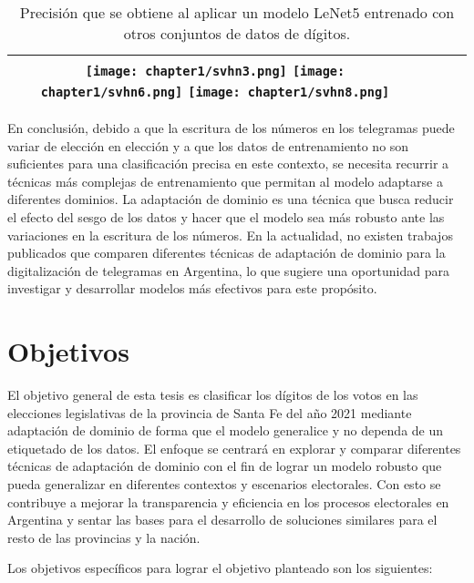 \begin{table}[H]
\begin{tabular}{c|ccc}
        \texttt{[image: chapter1/svhn3.png]}
        \texttt{[image: chapter1/svhn6.png]}
        \texttt{[image: chapter1/svhn8.png]}                              &                                                   &                                   &                                   \\
        \bottomrule
    \end{tabular}
    \caption{Precisión que se obtiene al aplicar un modelo LeNet5 entrenado con otros conjuntos de datos de dígitos.}
    \label{tab:lenet-distintos-datasets}
\end{table}

En conclusión, debido a que la escritura de los números en los telegramas puede variar de elección en elección y a que
los datos de entrenamiento no son suficientes para una clasificación precisa en este contexto, se necesita recurrir a
técnicas más complejas de entrenamiento que permitan al modelo adaptarse a diferentes dominios. La adaptación de
dominio es una técnica que busca reducir el efecto del sesgo de los datos y hacer que el modelo sea más robusto ante
las variaciones en la escritura de los números. En la actualidad, no existen trabajos publicados que comparen
diferentes técnicas de adaptación de dominio para la digitalización de telegramas en Argentina, lo que sugiere una
oportunidad para investigar y desarrollar modelos más efectivos para este propósito.

\section{Objetivos}

El objetivo general de esta tesis es clasificar los dígitos de los votos en las elecciones legislativas de la provincia
de Santa Fe del año 2021 mediante adaptación de dominio de forma que el modelo generalice y no dependa de un etiquetado
de los datos. El enfoque se centrará en explorar y comparar diferentes técnicas de adaptación de dominio con el fin de
lograr un modelo robusto que pueda generalizar en diferentes contextos y escenarios electorales. Con esto se contribuye
a mejorar la transparencia y eficiencia en los procesos electorales en Argentina y sentar las bases para el desarrollo
de soluciones similares para el resto de las provincias y la nación.

Los objetivos específicos para lograr el objetivo planteado son los siguientes:

